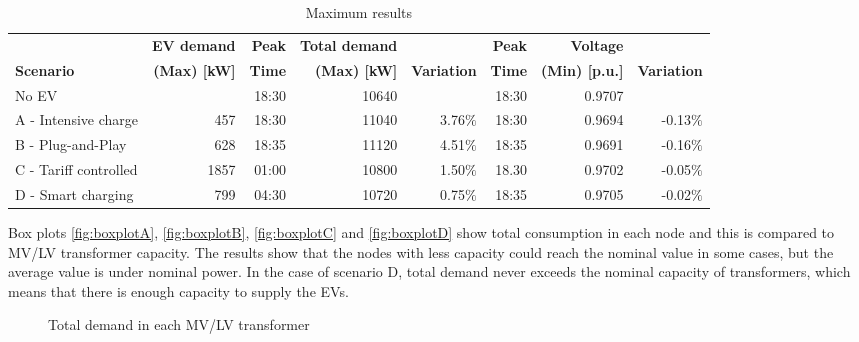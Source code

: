 \documentclass[a4paper,11pt,twoside,openright]{report}
\begin{document}
\begin{landscape}
	\begin{table}[h!]
		\centering
		\caption{Maximum results}
		\label{tab:max_result}
		\begin{tabular}{lrrrrrrr}
			& {\bf EV demand} & {\bf Peak } & {\bf Total demand}& & {\bf Peak } & {\bf Voltage} & \\
			{\bf Scenario} & {\bf (Max) [kW]} & {\bf Time} & {\bf (Max) [kW]} & {\bf Variation} & {\bf Time} & {\bf (Min)  [p.u.]} & {\bf Variation}  \\
			\hline
			No EV &  & 18:30& 10640 & & 18:30 & 0.9707 &    \\
			A - Intensive charge & 457 & 18:30 & 11040 & 3.76$\%$ & 18:30 & 0.9694 & -0.13$\%$  \\
			B - Plug-and-Play & 628 & 18:35 & 11120 & 4.51$\%$ & 18:35 & 0.9691 & -0.16$\%$  \\
			C - Tariff controlled & 1857 & 01:00 & 10800&  1.50$\%$ & 18.30 & 0.9702 & -0.05$\%$  \\
			D - Smart charging & 799 & 04:30 & 10720 & 0.75$\%$ & 18:35 & 0.9705 & -0.02$\%$  \\
			\hline
		\end{tabular}
	\end{table}
\end{landscape}


Box plots \ref{fig:boxplotA}, \ref{fig:boxplotB}, \ref{fig:boxplotC} and \ref{fig:boxplotD} show total consumption in each node and this is compared to MV/LV transformer capacity. The results show that the nodes with less capacity could reach the nominal value in some cases, but the average value is under nominal power. In the case of scenario D, total demand never exceeds the nominal capacity of transformers, which means that there is enough capacity to supply the EVs.

\begin{figure}[htbp]
	\centering
	\caption{Total demand in each MV/LV transformer}
\end{figure}
\end{document}
